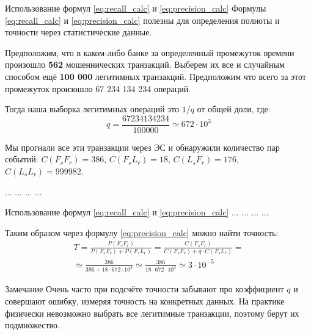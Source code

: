   \begin{frame}{Использование формул \eqref{eq:recall_calc} и \eqref{eq:precision_calc}}\label{frame:precision_calc_example}
  \small
  Формулы \eqref{eq:recall_calc} и \eqref{eq:precision_calc} полезны 
  для определения полноты и точности через статистические данные.
  
  Предположим, что в каком-либо банке за определенный промежуток времени
  произошло \textbf{562} мошеннических транзакций. 
  Выберем их все и случайным способом ещё \textbf{100 000} легитимных транзакций.
  Предположим что всего за этот промежуток произошло 67 234 134 234 операций. 
  
  Тогда наша выборка легитимных операций это $1/q$ от общей доли, где: 
  \begin{equation*}
  q = \frac{67234134234}{100000} \simeq 672 \cdot 10^3
  \end{equation*}
  
  Мы прогнали все эти транзакции через ЭС и обнаружили количество пар событий:
  $C(F_s F_r)= 386$, 
  $C(F_s L_r)= 18$, 
  $C(L_s F_r)= 176$, 
  $C(L_s L_r)= 999 982$.
   
  ... ... ... ...
  \end{frame}
   
  \begin{frame}{Использование формул \eqref{eq:recall_calc} и \eqref{eq:precision_calc}} 
  ... ... ... ...
  
  Таким образом через формулу  \eqref{eq:precision_calc} можно найти точность:
  \begin{eqnarray*}
  T = \frac{P(F_s F_r)}{P(F_s F_r) + P(F_s L_r )} = 
  \frac{C(F_s F_r)}{C(F_s F_r) + q \cdot C(F_s L_r)}  = \\
  \simeq \frac{386}{386 + 18 \cdot  672 \cdot 10^3 }
  \simeq \frac{386}{18 \cdot  672 \cdot 10^3 }
  \simeq 3 \cdot 10^{-5}
  \end{eqnarray*}
  
  \begin{block}{Замечание}
  	Очень часто при подсчёте точности забывают про коэффициент $q$ 
  	и совершают ошибку, измеряя точность на конкретных данных.
  	На практике физически невозможно выбрать все легитимные транзакции,
  	поэтому берут их подмножество.
  \end{block}

  \end{frame}
  
